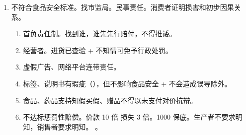 \begin{enumerate}
\begin{enumerate}
\begin{enumerate}
                \end{enumerate}
          \item 双报告制度。事故单位 + 医院 \yjt 卫生行政部门、县食品安全监督管理部门 \yjt 本级、上级政府。
          \item 流行病学调查（流调）。疾控中心。双报告。
        \end{enumerate}
  \item 不符合食品安全标准。找市监局。民事责任。消费者证明损害和初步因果关系。
        \begin{enumerate}
          \item 首负责任制。找到谁，谁先先行赔付，不得推诿。
          \item 经营者。进货已查验 + 不知情可免予行政处罚。
          \item 虚假广告、网络平台连带责任。
          \item 标签、说明书有瑕疵（），但不影响食品安全 + 不会造成误导除外。
          \item 食品、药品支持知假买假、赠品不得以未支付对价抗辩。
          \item 不达标惩罚性赔偿。价款 10 倍 \hz 损失 3 倍。1000 保底。生产者不要求明知，销售者要求明知。
                。
        \end{enumerate}
\end{enumerate}
